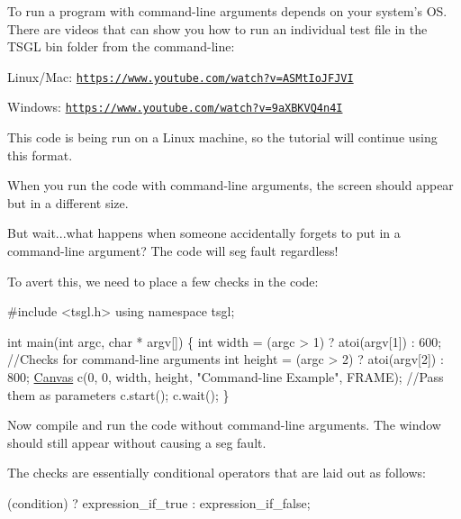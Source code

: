 To run a program with command-\/line arguments depends on your system's O\-S. There are videos that can show you how to run an individual test file in the T\-S\-G\-L bin folder from the command-\/line\-:


\begin{DoxyItemize}
\item Linux/\-Mac\-: \href{https://www.youtube.com/watch?v=ASMtIoJFJVI}{\tt https\-://www.\-youtube.\-com/watch?v=\-A\-S\-Mt\-Io\-J\-F\-J\-V\-I}
\item Windows\-: \href{https://www.youtube.com/watch?v=9aXBKVQ4n4I}{\tt https\-://www.\-youtube.\-com/watch?v=9a\-X\-B\-K\-V\-Q4n4\-I}
\end{DoxyItemize}

This code is being run on a Linux machine, so the tutorial will continue using this format.

When you run the code with command-\/line arguments, the screen should appear but in a different size.

But wait...what happens when someone accidentally forgets to put in a command-\/line argument? The code will seg fault regardless!

To avert this, we need to place a few checks in the code\-:


\begin{DoxyCode}
\textcolor{preprocessor}{#include <tsgl.h>}
\textcolor{keyword}{using namespace }tsgl;

\textcolor{keywordtype}{int} main(\textcolor{keywordtype}{int} argc, \textcolor{keywordtype}{char} * argv[]) \{
  \textcolor{keywordtype}{int} width = (argc > 1) ? atoi(argv[1]) : 600; \textcolor{comment}{//Checks for command-line arguments}
  \textcolor{keywordtype}{int} height = (argc > 2) ? atoi(argv[2]) : 800;
  \hyperlink{classtsgl_1_1_canvas}{Canvas} c(0, 0, width, height, \textcolor{stringliteral}{"Command-line Example"}, FRAME);  \textcolor{comment}{//Pass them as parameters}
  c.start();
  c.wait();
\}
\end{DoxyCode}


Now compile and run the code without command-\/line arguments. The window should still appear without causing a seg fault.

The checks are essentially conditional operators that are laid out as follows\-:


\begin{DoxyCode}
(condition) ? expression\_if\_true : expression\_if\_false;
\end{DoxyCode}


